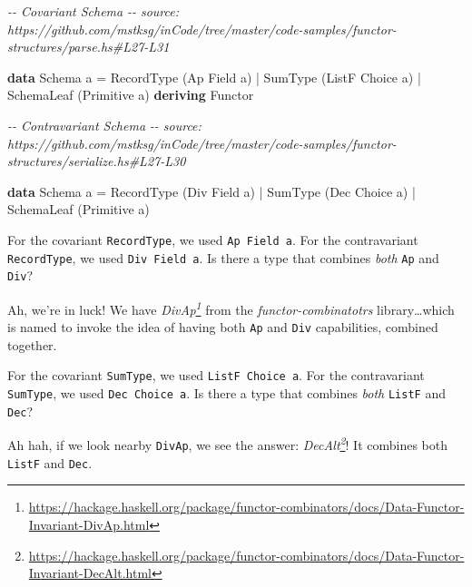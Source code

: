 \documentclass[]{article}
\newenvironment{Shaded}{}{}
\newcommand{\CommentTok}[1]{\textcolor[rgb]{0.38,0.63,0.69}{\textit{#1}}}
\newcommand{\DataTypeTok}[1]{\textcolor[rgb]{0.56,0.13,0.00}{#1}}
\newcommand{\KeywordTok}[1]{\textcolor[rgb]{0.00,0.44,0.13}{\textbf{#1}}}
\newcommand{\NormalTok}[1]{#1}
\newcommand{\OperatorTok}[1]{\textcolor[rgb]{0.40,0.40,0.40}{#1}}
\newcommand{\OtherTok}[1]{\textcolor[rgb]{0.00,0.44,0.13}{#1}}
\renewcommand{\href}[2]{#2\footnote{\url{#1}}}
\begin{document}
\begin{Shaded}
\begin{Highlighting}[]
\CommentTok{{-}{-} Covariant Schema}
\CommentTok{{-}{-} source: https://github.com/mstksg/inCode/tree/master/code{-}samples/functor{-}structures/parse.hs\#L27{-}L31}

\KeywordTok{data} \DataTypeTok{Schema}\NormalTok{ a }\OtherTok{=}
      \DataTypeTok{RecordType}\NormalTok{  (}\DataTypeTok{Ap} \DataTypeTok{Field}\NormalTok{ a)}
    \OperatorTok{|} \DataTypeTok{SumType}\NormalTok{     (}\DataTypeTok{ListF} \DataTypeTok{Choice}\NormalTok{ a)}
    \OperatorTok{|} \DataTypeTok{SchemaLeaf}\NormalTok{  (}\DataTypeTok{Primitive}\NormalTok{ a)}
  \KeywordTok{deriving} \DataTypeTok{Functor}

\CommentTok{{-}{-} Contravariant Schema}
\CommentTok{{-}{-} source: https://github.com/mstksg/inCode/tree/master/code{-}samples/functor{-}structures/serialize.hs\#L27{-}L30}

\KeywordTok{data} \DataTypeTok{Schema}\NormalTok{ a }\OtherTok{=}
      \DataTypeTok{RecordType}\NormalTok{  (}\DataTypeTok{Div} \DataTypeTok{Field}\NormalTok{ a)}
    \OperatorTok{|} \DataTypeTok{SumType}\NormalTok{     (}\DataTypeTok{Dec} \DataTypeTok{Choice}\NormalTok{ a)}
    \OperatorTok{|} \DataTypeTok{SchemaLeaf}\NormalTok{  (}\DataTypeTok{Primitive}\NormalTok{ a)}
\end{Highlighting}
\end{Shaded}

For the covariant \texttt{RecordType}, we used \texttt{Ap\ Field\ a}. For the
contravariant \texttt{RecordType}, we used \texttt{Div\ Field\ a}. Is there a
type that combines \emph{both} \texttt{Ap} and \texttt{Div}?

Ah, we're in luck! We have
\emph{\href{https://hackage.haskell.org/package/functor-combinators/docs/Data-Functor-Invariant-DivAp.html}{DivAp}}
from the \emph{functor-combinatotrs} library\ldots which is named to invoke the
idea of having both \texttt{Ap} and \texttt{Div} capabilities, combined
together.

For the covariant \texttt{SumType}, we used \texttt{ListF\ Choice\ a}. For the
contravariant \texttt{SumType}, we used \texttt{Dec\ Choice\ a}. Is there a type
that combines \emph{both} \texttt{ListF} and \texttt{Dec}?

Ah hah, if we look nearby \texttt{DivAp}, we see the answer:
\emph{\href{https://hackage.haskell.org/package/functor-combinators/docs/Data-Functor-Invariant-DecAlt.html}{DecAlt}}!
It combines both \texttt{ListF} and \texttt{Dec}.
\end{document}
